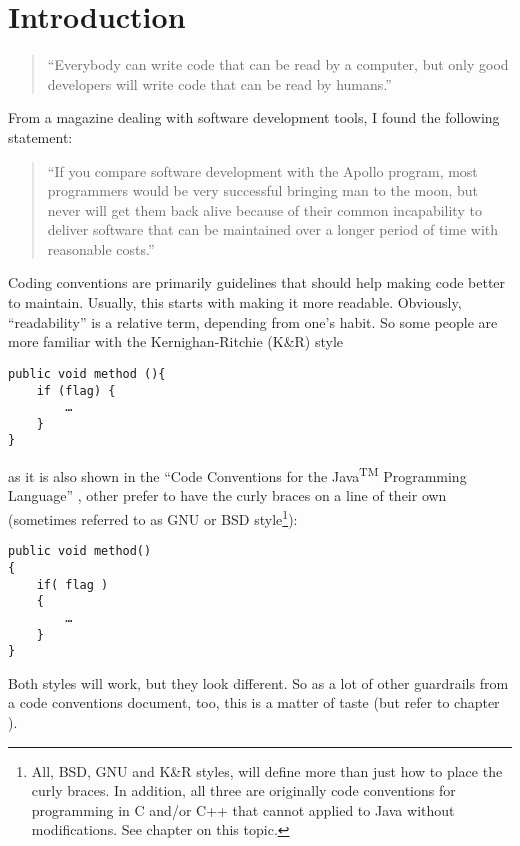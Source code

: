 \chapter{Introduction}

\begin{quotation}
“Everybody can write code that can be read by a computer,
but only good developers will write code that can be read by humans.”
\autocite{Fowler:Refactoring}
\end{quotation}

From a magazine dealing with software development tools, I found the following statement:

\begin{quotation}
“If you compare software development with the Apollo program, most programmers would be very successful bringing man to the moon, but never will get them back alive because of their common incapability to deliver software that can be maintained over a longer period of time with reasonable costs.”
\end{quotation}

Coding conventions are primarily guidelines that should help making code better to maintain. Usually, this starts with making it more readable. Obviously, “readability” is a relative term, depending from one's habit. So some people are more familiar with the Kernighan-Ritchie (K\&R) style

\begin{lstlisting}
public void method (){
    if (flag) {
        …
    }
}
\end{lstlisting}

as it is also shown in the “Code Conventions for the Java\textsuperscript{TM} Programming Language” \autocite{SUN_CODE_CONVENTIONS}, other prefer to have the curly braces on a line of their own (sometimes referred to as GNU or BSD style\footnote{All, BSD, GNU and K\&R styles, will define more than just how to place the curly braces. In addition, all three are originally code conventions for programming in C and/or C++ that cannot applied to Java without modifications. See chapter  on this topic.}):

\begin{lstlisting}
public void method()
{
    if( flag )
    {
    	…
    }
}
\end{lstlisting}

Both styles will work, but they look different. So as a lot of other guardrails from a code conventions document, too, this is a matter of taste (but refer to chapter ).

